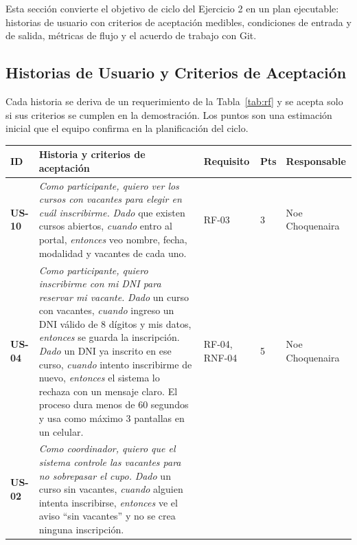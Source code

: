 \documentclass[11pt,a4paper]{article}
\begin{document}
Esta sección convierte el objetivo de ciclo del Ejercicio 2 en un plan ejecutable: historias de usuario con criterios de aceptación medibles, condiciones de entrada y de salida, métricas de flujo y el acuerdo de trabajo con Git.

\subsection{Historias de Usuario y Criterios de Aceptación}

Cada historia se deriva de un requerimiento de la Tabla~\ref{tab:rf} y se acepta solo si sus criterios se cumplen en la demostración. Los puntos son una estimación inicial que el equipo confirma en la planificación del ciclo.

\begin{table}[H]
\centering
\footnotesize
\renewcommand{\arraystretch}{1.25}
\begin{tabularx}{\textwidth}{P{1.15cm}YP{1.7cm}P{0.9cm}P{1.9cm}}
\toprule
\textbf{ID} & \textbf{Historia y criterios de aceptación} & \textbf{Requisito} & \textbf{Pts} & \textbf{Responsable} \\
\midrule
\textbf{US-10} & \textit{Como participante, quiero ver los cursos con vacantes para elegir en cuál inscribirme.}\newline
\textit{Dado} que existen cursos abiertos, \textit{cuando} entro al portal, \textit{entonces} veo nombre, fecha, modalidad y vacantes de cada uno. & RF-03 & 3 & Noe Choquenaira \\
\midrule
\textbf{US-04} & \textit{Como participante, quiero inscribirme con mi DNI para reservar mi vacante.}\newline
\textit{Dado} un curso con vacantes, \textit{cuando} ingreso un DNI válido de 8 dígitos y mis datos, \textit{entonces} se guarda la inscripción.\newline
\textit{Dado} un DNI ya inscrito en ese curso, \textit{cuando} intento inscribirme de nuevo, \textit{entonces} el sistema lo rechaza con un mensaje claro.\newline
El proceso dura menos de 60 segundos y usa como máximo 3 pantallas en un celular. & RF-04, RNF-04 & 5 & Noe Choquenaira \\
\midrule
\textbf{US-02} & \textit{Como coordinador, quiero que el sistema controle las vacantes para no sobrepasar el cupo.}\newline
\textit{Dado} un curso sin vacantes, \textit{cuando} alguien intenta inscribirse, \textit{entonces} ve el aviso ``sin vacantes'' y no se crea ninguna inscripción.\newline

\end{tabularx}
\end{table}
\end{document}
